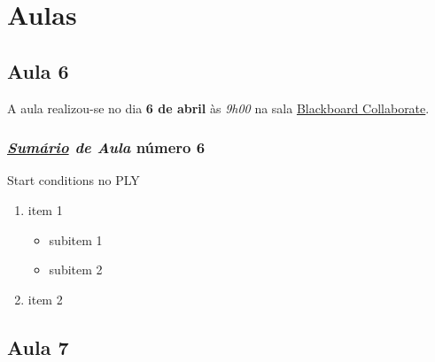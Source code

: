 \section{Aulas}

\subsection{Aula 6}

A aula realizou-se no dia \textbf{6 de abril}
às \textit{9h00} na sala \underline{Blackboard Collaborate}.

\subsubsection{\textit{\underline{Sumário} de Aula} número 6}
Start conditions no PLY

\begin{enumerate}
    \item item 1
        \begin{itemize}
            \item subitem 1
            \item subitem 2
        \end{itemize}
    \item item 2        
\end{enumerate}

\subsection{Aula 7}
